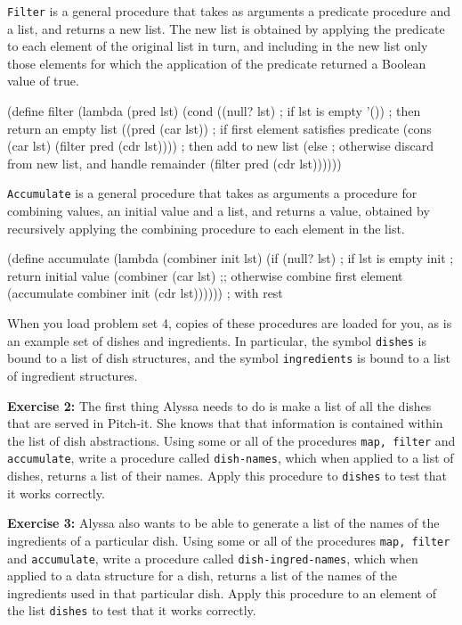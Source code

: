 {\tt Filter} is a general procedure that takes as arguments a predicate
procedure and a list, and returns a new list.  The new list is obtained
by applying the predicate to each element of the original list in turn,
and including in the new list only those elements for which the
application of the predicate returned a Boolean value of true.

\beginlisp
(define filter
  (lambda (pred lst)
    (cond ((null? lst)   ; if lst is empty
           '())          ; then return an empty list
          ((pred (car lst))  ; if first element satisfies predicate
           (cons (car lst) (filter pred (cdr lst))))  ; then add to new list
          (else  ; otherwise discard from new list, and handle remainder
           (filter pred (cdr lst))))))
\endlisp

{\tt Accumulate} is a general procedure that takes as arguments a
procedure for combining values, an initial value and a list, and returns
a value, obtained by recursively applying the combining procedure to
each element in the list.

\beginlisp
(define accumulate
  (lambda (combiner init lst)
     (if (null? lst)  ; if lst is empty
         init         ; return initial value
         (combiner (car lst)  ;; otherwise combine first element
                   (accumulate combiner init (cdr lst))))))  ; with rest
\endlisp


When you load problem set 4, copies of these procedures are loaded for
you, as is an example set of dishes and ingredients.  In particular, the
symbol {\tt dishes} is bound to a list of dish structures, and the
symbol {\tt ingredients} is bound to a list of ingredient structures. 

{\bf Exercise 2:} The first thing Alyssa needs to do is make a list of
all the dishes that are served in Pitch-it.  She knows that that
information is contained within the list of dish abstractions. Using
some or all of the procedures {\tt map, filter} 
and {\tt accumulate}, write a procedure called {\tt dish-names}, which
when applied to a list of dishes, returns a list of their names.  Apply
this procedure to {\tt dishes} to test that it works correctly.


{\bf Exercise 3:}  Alyssa also wants to be able to generate a list of
the names of the ingredients of a particular dish.  Using some or all
of the procedures {\tt map, filter} and {\tt accumulate}, write a
procedure called {\tt dish-ingred-names}, which when applied to a data
structure for a dish, returns a list of the names of the ingredients
used in that particular dish.  Apply this procedure to an element of the
list {\tt dishes} to test that it works correctly.  

